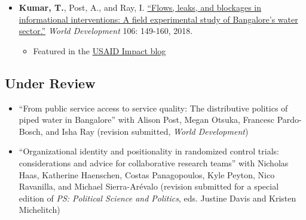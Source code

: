 \documentclass[11pt]{article}
\begin{document}
\begin{itemize}
\begin{itemize}
\end{itemize}

		\item[] \textbf{Kumar, T.}, Post, A., and Ray, I. \href{https://www.sciencedirect.com/science/article/pii/S0305750X1830032}{``Flows, leaks, and blockages in informational interventions: A field experimental study of Bangalore's water sector.''} \textit{World Development} 106: 149-160, 2018.
		\begin{itemize}[nosep]
		\item Featured in the \href{https://blog.usaid.gov/2016/05/using-mobile-phones-to-alert-households-waiting-for-nextdrop-of-water/}{USAID Impact blog}
		\end{itemize}
		

\end{itemize}

\subsection*{Under Review}

\begin{itemize}


\item[]``From public service access to service quality: The distributive politics of piped water in Bangalore'' with Alison Post, Megan Otsuka, Francesc Pardo-Bosch, and Isha Ray (revision submitted, \textit{World Development})
	

	

	\item[]``Organizational identity and positionality in randomized control trials: considerations and advice for collaborative research teams'' with Nicholas Haas, Katherine Haenschen, Costas Panagopoulos, Kyle Peyton, Nico Ravanilla, and Michael  Sierra-Ar\'{e}valo (revision submitted for a special edition of \textit{PS: Political Science and Politics}, eds. Justine Davis and Kristen Michelitch)
		
		\end{itemize}
		
\end{document}
